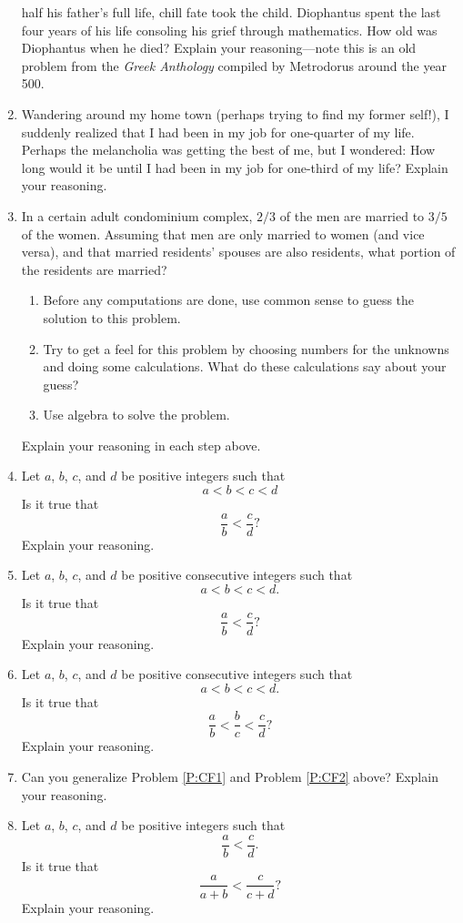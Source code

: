 \begin{problems}
\begin{enumerate}
  half his father's full life, chill fate took the child. Diophantus
  spent the last four years of his life consoling his grief through
  mathematics. How old was Diophantus when he died?  Explain your
  reasoning---note this is an old problem from the \textit{Greek
    Anthology} compiled by Metrodorus around the year 500.
\item Wandering around my home town (perhaps trying to find my former
  self!), I suddenly realized that I had been in my job for
  one-quarter of my life. Perhaps the melancholia was getting the best
  of me, but I wondered: How long would it be until I had been in my
  job for one-third of my life? Explain your reasoning.
\item In a certain adult condominium complex, $2/3$ of the men are
  married to $3/5$ of the women. Assuming that men are only married to
  women (and vice versa), and that married residents' spouses are also
  residents, what portion of the residents are married? 
\begin{enumerate}
\item Before any computations are done, use common sense to guess the
  solution to this problem.
\item Try to get a feel for this problem by choosing numbers for the
  unknowns and doing some calculations. What do these calculations say
  about your guess?
\item Use algebra to solve the problem.
\end{enumerate}
Explain your reasoning in each step above.

\item Let $a$, $b$, $c$, and $d$ be positive integers such that 
\[
a<b<c<d
\]
Is it true that 
\[
\frac{a}{b}<\frac{c}{d}?
\]
Explain your reasoning.
\item\label{P:CF1} Let $a$, $b$, $c$, and $d$ be positive consecutive
  integers such that
\[
a<b<c<d.
\]
Is it true that 
\[
\frac{a}{b}<\frac{c}{d}?
\]
Explain your reasoning.
\item\label{P:CF2} Let $a$, $b$, $c$, and $d$ be positive consecutive
  integers such that
\[
a<b<c<d.
\]
Is it true that 
\[
\frac{a}{b}<\frac{b}{c}<\frac{c}{d}?
\]
Explain your reasoning.
\item Can you generalize Problem \ref{P:CF1} and Problem \ref{P:CF2}
  above? Explain your reasoning.
\item Let $a$, $b$, $c$, and $d$ be positive integers such that 
\[
\frac{a}{b}<\frac{c}{d}.
\]
Is it true that 
\[
\frac{a}{a+b}<\frac{c}{c+d}?
\]
Explain your reasoning.
\end{enumerate}
\end{problems}

